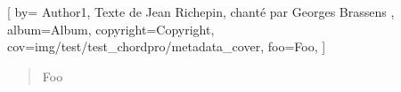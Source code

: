 
[
  by={
         Author1,
        Texte de Jean Richepin, chanté par Georges Brassens  },
  album={Album},
  copyright={Copyright},
    cov={img/test/test_chordpro/metadata_cover},
  foo={Foo},
]

\cover




\begin{verse}
    Foo
\end{verse}

\endsong
